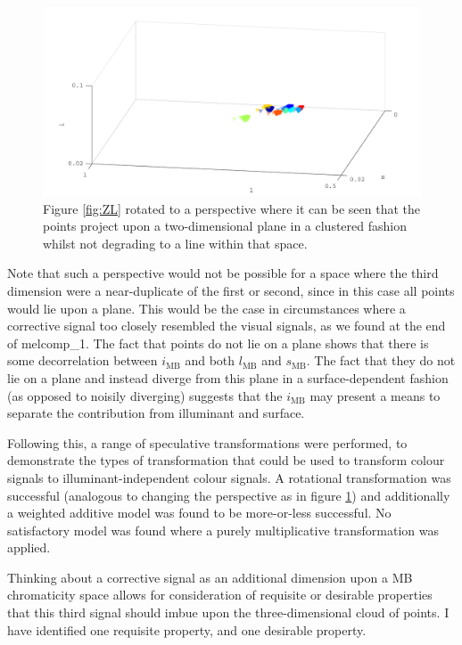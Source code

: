 \begin{figure}[htbp] %
 \includegraphics[max width=\textwidth]{figs/comp/melcomp_2_caller/viewpoint.pdf}
 \caption{Figure \ref{fig:ZL} rotated to a perspective where it can be seen that the points project upon a two-dimensional plane in a clustered fashion whilst not degrading to a line within that space.}
 \label{fig:viewpoint}
\end{figure} 

Note that such a perspective would not be possible for a space where the third dimension were a near-duplicate of the first or second, since in this case all points would lie upon a plane. This would be the case in circumstances where a corrective signal too closely resembled the visual signals, as we found at the end of melcomp\_1. The fact that points do not lie on a plane shows that there is some decorrelation between $i_{\text{MB}}$ and both $l_{\text{MB}}$ and $s_{\text{MB}}$. The fact that they do not lie on a plane and instead diverge from this plane in a surface-dependent fashion (as opposed to noisily diverging) suggests that the $i_{\text{MB}}$ may present a means to separate the contribution from illuminant and surface. 

Following this, a range of speculative transformations were performed, to demonstrate the types of transformation that could be used to transform colour signals to illuminant-independent colour signals. A rotational transformation was successful (analogous to changing the perspective as in figure \ref{fig:viewpoint}) and additionally a weighted additive model was found to be more-or-less successful. No satisfactory model was found where a purely multiplicative transformation was applied.

Thinking about a corrective signal as an additional dimension upon a \gls{MB} chromaticity space allows for consideration of requisite or desirable properties that this third signal should imbue upon the three-dimensional cloud of points. I have identified one requisite property, and one desirable property. 

